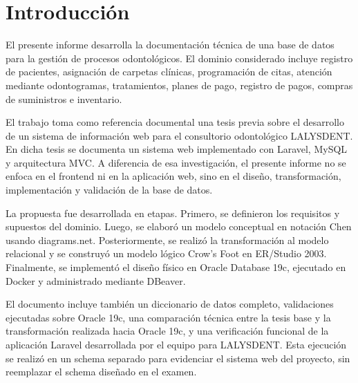 \section{Introducción}

El presente informe desarrolla la documentación técnica de una base de datos para la gestión de procesos odontológicos. El dominio considerado incluye registro de pacientes, asignación de carpetas clínicas, programación de citas, atención mediante odontogramas, tratamientos, planes de pago, registro de pagos, compras de suministros e inventario.

El trabajo toma como referencia documental una tesis previa sobre el desarrollo de un sistema de información web para el consultorio odontológico LALYSDENT. En dicha tesis se documenta un sistema web implementado con Laravel, MySQL y arquitectura MVC. A diferencia de esa investigación, el presente informe no se enfoca en el frontend ni en la aplicación web, sino en el diseño, transformación, implementación y validación de la base de datos.

La propuesta fue desarrollada en etapas. Primero, se definieron los requisitos y supuestos del dominio. Luego, se elaboró un modelo conceptual en notación Chen usando diagrams.net. Posteriormente, se realizó la transformación al modelo relacional y se construyó un modelo lógico Crow's Foot en ER/Studio 2003. Finalmente, se implementó el diseño físico en Oracle Database 19c, ejecutado en Docker y administrado mediante DBeaver.

El documento incluye también un diccionario de datos completo, validaciones ejecutadas sobre Oracle 19c, una comparación técnica entre la tesis base y la transformación realizada hacia Oracle 19c, y una verificación funcional de la aplicación Laravel desarrollada por el equipo para LALYSDENT. Esta ejecución se realizó en un schema separado para evidenciar el sistema web del proyecto, sin reemplazar el schema diseñado en el examen.
